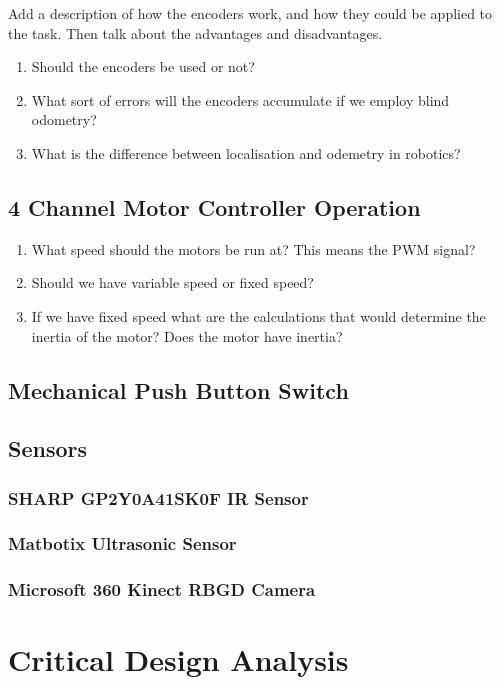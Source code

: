 \documentclass[a4paper]{article}
\begin{document}
Add a description of how the encoders work, and how they could be applied to the task. Then talk about the advantages and disadvantages.

\begin{enumerate}
\item Should the encoders be used or not?
\item What sort of errors will the encoders accumulate if we employ blind odometry?
\item What is the difference between localisation and odemetry in robotics?
\end{enumerate}

\subsection{4 Channel Motor Controller Operation}
\begin{enumerate}
\item What speed should the motors be run at? This means the PWM signal?
\item Should we have variable speed or fixed speed?
\item If we have fixed speed what are the calculations that would determine the inertia of the motor? Does the motor have inertia?
\end{enumerate}
\subsection{Mechanical Push Button Switch}
\subsection{Sensors}
\subsubsection{SHARP GP2Y0A41SK0F IR Sensor}
\subsubsection{Matbotix Ultrasonic Sensor}
\subsubsection{Microsoft 360 Kinect RBGD Camera}

\section{Critical Design Analysis}
\end{document}
